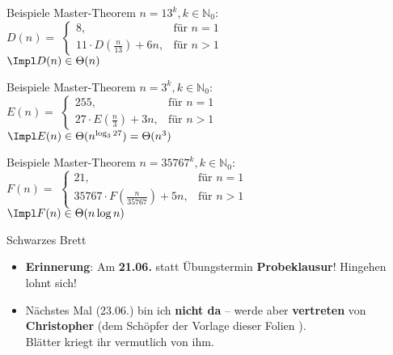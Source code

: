 \begin{frame}{Beispiele Master-Theorem}
	$n = 13^k, k \in \mathbb{N}_0$: \\[0,25cm]
	$D(n) = $
	\begin{math}
		\begin{cases}
		8,                              & \text{für } n = 1 \\
		11 \cdot D(\frac{n}{13}) + 6n,  & \text{für } n > 1
		\end{cases}
	\end{math} \\[0,5cm]
	\pause
	$\Impl D(n) \in \Theta(n)$
\end{frame}


\begin{frame}{Beispiele Master-Theorem}
	$n = 3^k, k \in \mathbb{N}_0$: \\[0,25cm]
	$E(n) = $ 
	\begin{math}
		\begin{cases}
		255,                            & \text{für } n = 1 \\
		27 \cdot E(\frac{n}{3}) + 3n,   & \text{für } n > 1
		\end{cases}
	\end{math} \\[0,5cm]
	\pause
	$\Impl E(n) \in \Theta(n^{\log _{3}27}) = \Theta(n^3)$
\end{frame}


\begin{frame}{Beispiele Master-Theorem}
	$n = 35767^k, k \in \mathbb{N}_0$: \\[0,25cm]
	$F(n) = $
	\begin{math}
		\begin{cases}
		21,                                   & \text{für } n = 1 \\
		35767 \cdot F(\frac{n}{35767}) + 5n,  & \text{für } n > 1
		\end{cases}
	\end{math} \\[0,5cm]
	\pause
	$\Impl F(n) \in \Theta(n\log n)$
\end{frame}

\fi


\begin{frame}{Schwarzes Brett}
	\begin{itemize}
		\item \textbf{Erinnerung}: Am \textbf{21.06.} statt Übungstermin \textbf{Probeklausur}! Hingehen lohnt sich!
		\item Nächstes Mal (23.06.) bin ich \textbf{nicht da} – werde aber \textbf{vertreten} von \textbf{Christopher} (dem Schöpfer der Vorlage dieser Folien \smiley). \\
		Blätter kriegt ihr vermutlich von ihm.
	\end{itemize}
\end{frame}

